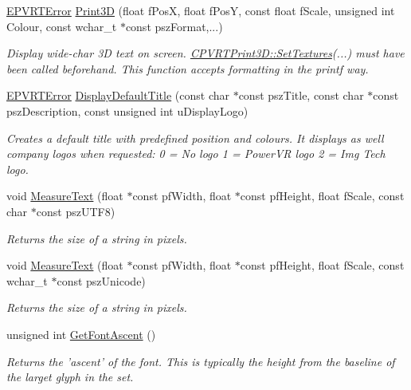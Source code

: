 \begin{DoxyCompactItemize}
\hyperlink{_p_v_r_t_error_8h_a9e837ff1a83f3a5f332bc4cc78454608}{E\+P\+V\+R\+T\+Error} \hyperlink{class_c_p_v_r_t_print3_d_a00f8bd769478fa34fc5f0e7113066759}{Print3\+D} (float f\+Pos\+X, float f\+Pos\+Y, const float f\+Scale, unsigned int Colour, const wchar\+\_\+t $\ast$const psz\+Format,...)
\begin{DoxyCompactList}\small\item\em Display wide-\/char 3\+D text on screen. \hyperlink{class_c_p_v_r_t_print3_d_a83a1fbe0a34d14a6a0d206b1e555dda7}{C\+P\+V\+R\+T\+Print3\+D\+::\+Set\+Textures}(...) must have been called beforehand. This function accepts formatting in the printf way. \end{DoxyCompactList}\item 
\hyperlink{_p_v_r_t_error_8h_a9e837ff1a83f3a5f332bc4cc78454608}{E\+P\+V\+R\+T\+Error} \hyperlink{class_c_p_v_r_t_print3_d_a2bccb1ef64d69a433696094987799d79}{Display\+Default\+Title} (const char $\ast$const psz\+Title, const char $\ast$const psz\+Description, const unsigned int u\+Display\+Logo)
\begin{DoxyCompactList}\small\item\em Creates a default title with predefined position and colours. It displays as well company logos when requested\+: 0 = No logo 1 = Power\+V\+R logo 2 = Img Tech logo. \end{DoxyCompactList}\item 
void \hyperlink{class_c_p_v_r_t_print3_d_aaba0e9b4cd00538e8592b7aeb1c64312}{Measure\+Text} (float $\ast$const pf\+Width, float $\ast$const pf\+Height, float f\+Scale, const char $\ast$const psz\+U\+T\+F8)
\begin{DoxyCompactList}\small\item\em Returns the size of a string in pixels. \end{DoxyCompactList}\item 
void \hyperlink{class_c_p_v_r_t_print3_d_aa12963cb94d9b301293dfb47ff03d008}{Measure\+Text} (float $\ast$const pf\+Width, float $\ast$const pf\+Height, float f\+Scale, const wchar\+\_\+t $\ast$const psz\+Unicode)
\begin{DoxyCompactList}\small\item\em Returns the size of a string in pixels. \end{DoxyCompactList}\item 
unsigned int \hyperlink{class_c_p_v_r_t_print3_d_ade7d01d7a38beabc5788b265ace73898}{Get\+Font\+Ascent} ()
\begin{DoxyCompactList}\small\item\em Returns the 'ascent' of the font. This is typically the height from the baseline of the larget glyph in the set. \end{DoxyCompactList}\item 

\end{DoxyCompactItemize}

